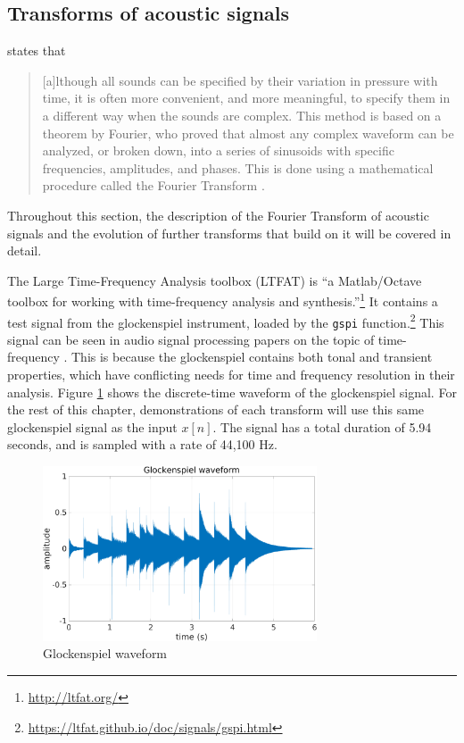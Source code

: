 \documentclass[report.tex]{subfiles}
\begin{document}
\subsection{Transforms of acoustic signals}
\label{sec:freqdomain}

\citeauthor{moore} states that

\begin{quote}
	[a]lthough all sounds can be specified by their variation in pressure with time, it is often more convenient, and more meaningful, to specify them in a different way when the sounds are complex. This method is based on a theorem by Fourier, who proved that almost any complex waveform can be analyzed, or broken down, into a series of sinusoids with specific frequencies, amplitudes, and phases. This is done using a mathematical procedure called the Fourier Transform \parencite[4]{moore}.
\end{quote}

Throughout this section, the description of the Fourier Transform of acoustic signals and the evolution of further transforms that build on it will be covered in detail.

The Large Time-Frequency Analysis toolbox (LTFAT) is ``a Matlab/Octave toolbox for working with time-frequency analysis and synthesis.''\footnote{\url{http://ltfat.org/}} It contains a test signal from the glockenspiel instrument, loaded by the \Verb#gspi# function.\footnote{\url{https://ltfat.github.io/doc/signals/gspi.html}} This signal can be seen in audio signal processing papers on the topic of time-frequency \parencite{doerflerphd, balazs, jaillet, tfjigsaw, invertiblecqt, wmdct}. This is because the glockenspiel contains both tonal and transient properties, which have conflicting needs for time and frequency resolution in their analysis. Figure \ref{fig:glockwaveform} shows the discrete-time waveform of the glockenspiel signal. For the rest of this chapter, demonstrations of each transform will use this same glockenspiel signal as the input $x[n]$. The signal has a total duration of 5.94 seconds, and is sampled with a rate of 44,100 Hz.

\begin{figure}[ht]
	\centering
	\includegraphics[width=0.725\textwidth]{./images-gspi/glock_waveform.png}
	\caption{Glockenspiel waveform}
	\label{fig:glockwaveform}
\end{figure}
\end{document}
